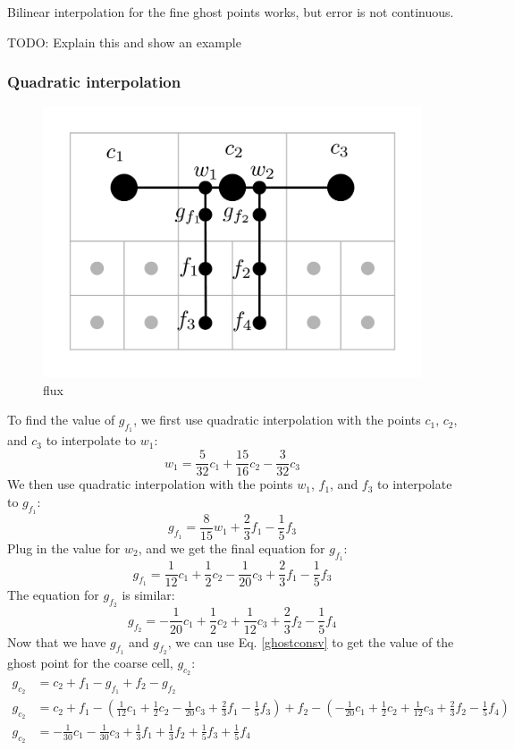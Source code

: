 \documentclass[12pt]{article}
\begin{document}
Bilinear interpolation for the fine ghost points works, but error is not continuous.

TODO: Explain this and show an example

\subsubsection*{Quadratic interpolation}



\begin{figure}[H]
    \centering
    \includegraphics[width=5in]{images/quadstencil.pdf}
    \caption{flux}
\end{figure}

To find the value of $g_{f_1}$, we first use quadratic interpolation with the points 
$c_1$, $c_2$, and $c_3$ to interpolate to $w_1$:
\begin{equation*}
    w_1=\frac{5}{32}c_1+\frac{15}{16}c_2-\frac{3}{32}c_3
\end{equation*}
We then use quadratic interpolation with the points 
$w_1$, $f_1$, and $f_3$ to interpolate to $g_{f_1}$:
\begin{equation*}
    g_{f_1}=\frac{8}{15}w_1+\frac{2}{3}f_1-\frac{1}{5}f_3
\end{equation*}
Plug in the value for $w_2$, and we get the final equation for $g_{f_1}$:
\begin{equation*}
    g_{f_1}=\frac{1}{12}c_1+\frac{1}{2}c_2-\frac{1}{20}c_3 +\frac{2}{3}f_1-\frac{1}{5}f_3
\end{equation*}
The equation for $g_{f_2}$ is similar:
\begin{equation*}
    g_{f_2}=-\frac{1}{20}c_1+\frac{1}{2}c_2+\frac{1}{12}c_3 +\frac{2}{3}f_2-\frac{1}{5}f_4
\end{equation*}
Now that we have $g_{f_1}$ and $g_{f_2}$, we can use Eq. \ref{ghostconsv} to get the value of
the ghost point for the coarse cell, $g_{c_2}$:
\begin{align*}
    g_{c_2}&=c_2+f_1-g_{f_1}+f_2-g_{f_2}\\
    g_{c_2}&=c_2+f_1-\left(\frac{1}{12}c_1+\frac{1}{2}c_2-\frac{1}{20}c_3 +\frac{2}{3}f_1-
    \frac{1}{5}f_3\right)+f_2-\left(-\frac{1}{20}c_1+\frac{1}{2}c_2+\frac{1}{12}c_3
    +\frac{2}{3}f_2-\frac{1}{5}f_4\right)\\
    g_{c_2}&=-\frac{1}{30}c_1-\frac{1}{30}c_3+\frac{1}{3}f_1+\frac{1}{3}f_2+\frac{1}{5}f_3+
    \frac{1}{5}f_4
\end{align*}
\end{document}
